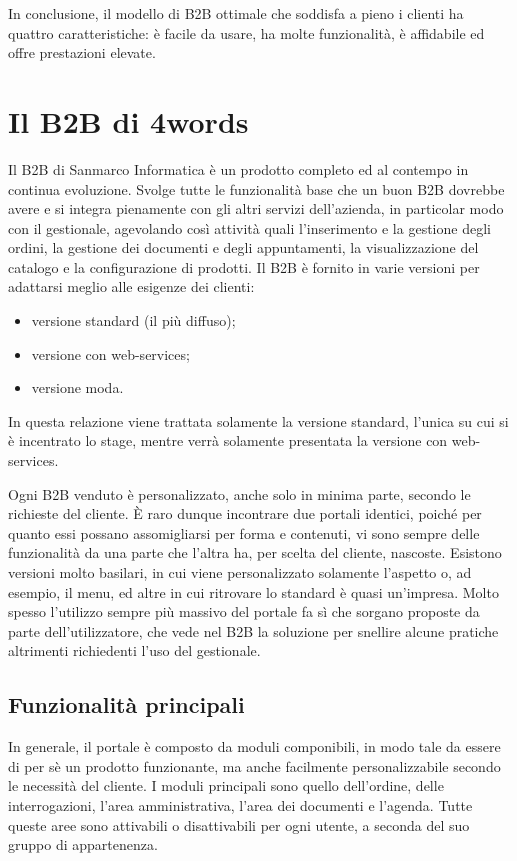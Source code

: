 In conclusione, il modello di B2B ottimale che soddisfa a pieno i clienti ha quattro caratteristiche: è facile da usare, ha molte funzionalità, è affidabile ed offre prestazioni elevate.

\section{Il B2B di 4words}\label{sec:b2b-smi}
Il B2B di Sanmarco Informatica è un prodotto completo ed al contempo in continua evoluzione. Svolge tutte le funzionalità base che un buon B2B dovrebbe avere e si integra pienamente con gli altri servizi dell'azienda, in particolar modo con il gestionale, agevolando così attività quali l'inserimento e la gestione degli ordini, la gestione dei documenti e degli appuntamenti, la visualizzazione del catalogo e la configurazione di prodotti. Il B2B è fornito in varie versioni per adattarsi meglio alle esigenze dei clienti:
\begin{itemize}
	\item versione standard (il più diffuso);
	\item versione con web-services;
	\item versione moda.
\end{itemize}
In questa relazione viene trattata solamente la versione standard, l'unica su cui si è incentrato lo stage, mentre verrà solamente presentata la versione con web-services.

Ogni B2B venduto è personalizzato, anche solo in minima parte, secondo le richieste del cliente. È raro dunque incontrare due portali identici, poiché per quanto essi possano assomigliarsi per forma e contenuti, vi sono sempre delle funzionalità da una parte che l'altra ha, per scelta del cliente, nascoste.
Esistono versioni molto basilari, in cui viene personalizzato solamente l'aspetto o, ad esempio, il menu, ed altre in cui ritrovare lo standard è quasi un'impresa. Molto spesso l'utilizzo sempre più massivo del portale fa sì che sorgano proposte da parte dell'utilizzatore, che vede nel B2B la soluzione per snellire alcune pratiche altrimenti richiedenti l'uso del gestionale.

\subsection{Funzionalità principali}
In generale, il portale è composto da moduli componibili, in modo tale da essere di per sè un prodotto funzionante, ma anche facilmente personalizzabile secondo le necessità del cliente. I moduli principali sono quello dell'ordine, delle interrogazioni, l'area amministrativa, l'area dei documenti e l'agenda. Tutte queste aree sono attivabili o disattivabili per ogni utente, a seconda del suo gruppo di appartenenza. 

